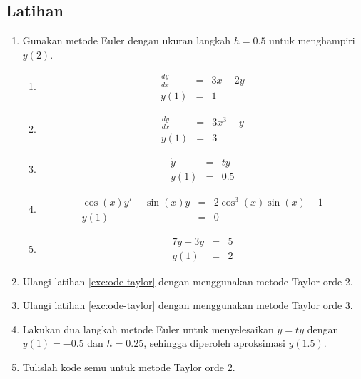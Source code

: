 \subsection{Latihan}
\begin{enumerate}
\item \label{exc:ode-taylor}Gunakan metode Euler dengan ukuran langkah
$h=0.5$ untuk menghampiri $y(2)$.

\begin{enumerate}
\item \label{exc:ode-taylor-6} \hasasolution 
\begin{eqnarray*}
\frac{dy}{dx} & = & 3x-2y\\
y(1) & = & 1
\end{eqnarray*}
\item 
\begin{eqnarray*}
\frac{dy}{dx} & = & 3x^{3}-y\\
y(1) & = & 3
\end{eqnarray*}
\item \label{exc:ode-taylor-7} \hasananswer 
\begin{eqnarray*}
\dot{y} & = & ty\\
y(1) & = & 0.5
\end{eqnarray*}
\item \label{exc:ode-taylor-8} \hasasolution 
\begin{eqnarray*}
\cos(x)y'+\sin(x)y & = & 2\cos^{3}(x)\sin(x)-1\\
y(1) & = & 0
\end{eqnarray*}
\item 
\begin{eqnarray*}
7\dot{y}+3y & = & 5\\
y(1) & = & 2
\end{eqnarray*}
\end{enumerate}
\item \label{exc:ode-taylor-9}Ulangi latihan \ref{exc:ode-taylor} dengan
menggunakan metode Taylor orde 2.  \haspartwithsolution  \haspartwithanswer 
\item \label{exc:ode-taylor-10}Ulangi latihan \ref{exc:ode-taylor} dengan
menggunakan metode Taylor orde 3.  \haspartwithsolution  \haspartwithanswer 
\item \label{exc:ode-taylor-1}Lakukan dua langkah metode Euler untuk menyelesaikan
$\dot{y}=ty$ dengan $y(1)=-0.5$ dan $h=0.25$, sehingga diperoleh
aproksimasi $y(1.5)$. \hasananswer 
\item \label{exc:ode-taylor-11}Tulislah kode semu untuk metode Taylor orde
2. \hasananswer 

\end{enumerate}
